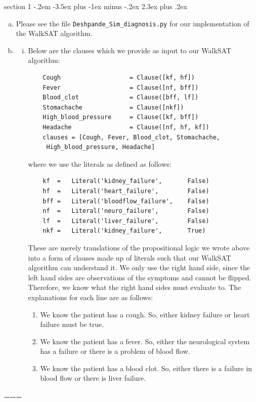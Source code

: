 \documentclass[12pt]{article}
\makeatletter
\newenvironment{problem}{\@startsection
       {section}
       {1}
       {-.2em}
       {-3.5ex plus -1ex minus -.2ex}
       {2.3ex plus .2ex}
       {\pagebreak[3] %
       \large\bf\noindent{Problem }
       }
       }
       {%
       \begin{center}\large\bf \ldots\ldots\ldots\end{center}}
\makeatother
\begin{document}
\begin{problem}{}
\begin{enumerate}[a.]
\item Please see the file \verb|Deshpande_Sim_diagnosis.py| for our implementation of the WalkSAT algorithm.

\item 
\begin{enumerate}[i.]
\item Below are the clauses which we provide as input to our WalkSAT algorithm:

\begin{verbatim}
    Cough                   = Clause([kf, hf])
    Fever                   = Clause([nf, bff])
    Blood_clot              = Clause([bff, lf])
    Stomachache             = Clause([nkf])
    High_blood_pressure     = Clause([kf, bff])
    Headache                = Clause([nf, hf, kf])
    clauses = [Cough, Fever, Blood_clot, Stomachache,
     High_blood_pressure, Headache]
\end{verbatim}

where we use the literals as defined as follows:

\begin{verbatim}
    kf  =   Literal('kidney_failure',       False)
    hf  =   Literal('heart_failure',        False)
    bff =   Literal('bloodflow_failure',    False)
    nf  =   Literal('neuro_failure',        False)
    lf  =   Literal('liver_failure',        False)
    nkf =   Literal('kidney_failure',       True)
\end{verbatim}
These are merely translations of the propositional logic we wrote above into a form of clauses made up of literals such that our WalkSAT algorithm can understand it. We only use the right hand side, since the left hand sides are observations of the symptoms and cannot be flipped. Therefore, we know what the right hand sides must evaluate to. The explanations for each line are as follows:
\begin{enumerate}
\item We know the patient has a cough. So, either kidney failure or heart failure must be true.

\item We know the patient has a fever. So, either the neurological system has a failure or there is a problem of blood flow.

\item We know the patient has a blood clot. So, either there is a failure in blood flow or there is liver failure.


\end{enumerate}
\end{enumerate}
\end{enumerate}
\end{problem}
\end{document}
